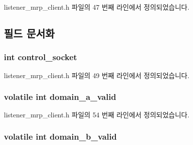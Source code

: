 listener\+\_\+mrp\+\_\+client.\+h 파일의 47 번째 라인에서 정의되었습니다.



\subsection{필드 문서화}
\subsubsection[{\texorpdfstring{control\+\_\+socket}{control_socket}}]{\setlength{\rightskip}{0pt plus 5cm}int control\+\_\+socket}\hypertarget{structmrp__listener__ctx_ab16a0c776c464dcfb5cf8a013a137647}{}\label{structmrp__listener__ctx_ab16a0c776c464dcfb5cf8a013a137647}


listener\+\_\+mrp\+\_\+client.\+h 파일의 49 번째 라인에서 정의되었습니다.

\subsubsection[{\texorpdfstring{domain\+\_\+a\+\_\+valid}{domain_a_valid}}]{\setlength{\rightskip}{0pt plus 5cm}volatile int domain\+\_\+a\+\_\+valid}\hypertarget{structmrp__listener__ctx_ae3be05692572d8c757174629541e2d91}{}\label{structmrp__listener__ctx_ae3be05692572d8c757174629541e2d91}


listener\+\_\+mrp\+\_\+client.\+h 파일의 54 번째 라인에서 정의되었습니다.

\subsubsection[{\texorpdfstring{domain\+\_\+b\+\_\+valid}{domain_b_valid}}]{\setlength{\rightskip}{0pt plus 5cm}volatile int domain\+\_\+b\+\_\+valid}\hypertarget{structmrp__listener__ctx_add1f58f9a17de764566dbf2e352b907f}{}\label{structmrp__listener__ctx_add1f58f9a17de764566dbf2e352b907f}


